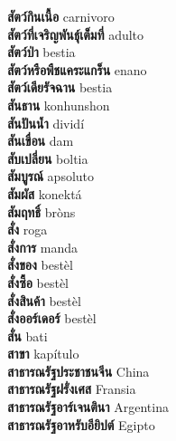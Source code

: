 \textbf{ สัตว์กินเนื้อ  } carnivoro \\
\textbf{ สัตว์ที่เจริญพันธุ์เต็มที่  } adulto \\
\textbf{ สัตว์ป่า  } bestia \\
\textbf{ สัตว์หรือพืชแคระแกร็น  } enano \\
\textbf{ สัตว์เดียรัจฉาน  } bestia \\
\textbf{ สันธาน  } konhunshon \\
\textbf{ สันปันน้ำ  } dividí \\
\textbf{ สันเขื่อน  } dam \\
\textbf{ สับเปลี่ยน  } boltia \\
\textbf{ สัมบูรณ์  } apsoluto \\
\textbf{ สัมผัส  } konektá \\
\textbf{ สัมฤทธิ์  } bròns \\
\textbf{ สั่ง  } roga \\
\textbf{ สั่งการ  } manda \\
\textbf{ สั่งของ  } bestèl \\
\textbf{ สั่งซื้อ  } bestèl \\
\textbf{ สั่งสินค้า  } bestèl \\
\textbf{ สั่งออร์เดอร์  } bestèl \\
\textbf{ สั่น  } bati \\
\textbf{ สาขา  } kapítulo \\
\textbf{ สาธารณรัฐประชาชนจีน  } China \\
\textbf{ สาธารณรัฐฝรั่งเศส  } Fransia \\
\textbf{ สาธารณรัฐอาร์เจนตินา  } Argentina \\
\textbf{ สาธารณรัฐอาหรับอียิปต์  } Egipto \\
